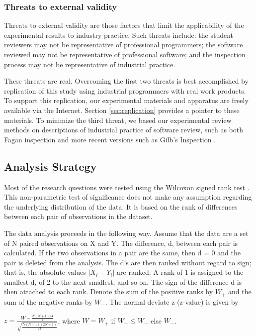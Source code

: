 \subsubsection{Threats to external validity}

Threats to external validity are those factors that limit the applicability
of the experimental results to industry practice. Such threats include: the
student reviewers may not be representative of professional programmers;
the software reviewed may not be representative of professional software;
and the inspection process may not be representative of industrial
practice.

These threats are real.  Overcoming the first two threats is best
accomplished by replication of this study using industrial programmers with
real work products. To support this replication, our experimental materials
and apparatus are freely available via the Internet. Section
\ref{sec:replication} provides a pointer to these materials.  To minimize
the third threat, we based our experimental review methods on descriptions
of industrial practice of software review, such as both Fagan inspection
\cite {Fagan76} and more recent versions such as Gilb's Inspection
\cite{Gilb93}.

\subsection{Analysis Strategy}

Most of the research questions were tested using the Wilcoxon signed rank
test \cite{Ferguson89}. This non-parametric test of significance does not
make any assumption regarding the underlying distribution of the data.  It
is based on the rank of differences between each pair of observations in
the dataset.

The data analysis proceeds in the following way. Assume that the data are a
set of N paired observations on X and Y. The difference, d, between each
pair is calculated.  If the two observations in a pair are the same, then d
= 0 and the pair is deleted from the analysis. The d's are then ranked
without regard to sign; that is, the absolute values $|X_{i} - Y_{i}|$ are
ranked. A rank of 1 is assigned to the smallest d, of 2 to the next
smallest, and so on. The sign of the difference d is then attached to each
rank. Denote the sum of the positive ranks by $W_{+}$ and the sum of the
negative ranks by $W_{-}$. The normal deviate z (z-value) is given by

\small
 \( z = \frac{W - \frac{N(N+1)/4}{4}}{\sqrt{\frac{N(N+1)(2N+1)}{24}}} \),
where $W = W_{+}$ if $W_{+} \leq W_{-}$ else $W_{-}$.

